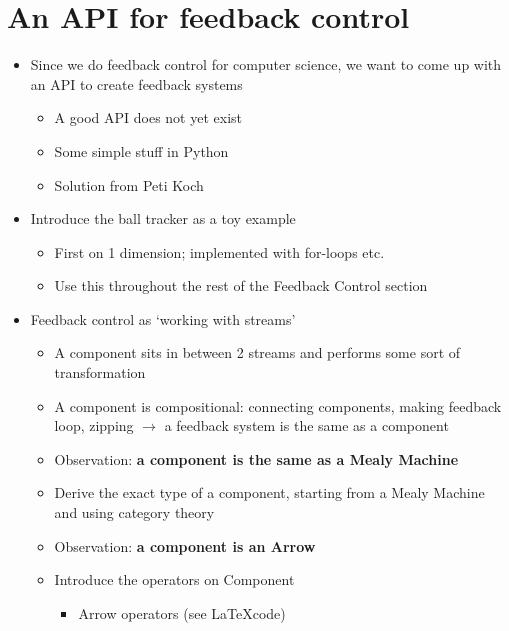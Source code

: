 \chapter{An API for feedback control}


\begin{itemize}
	\item Since we do feedback control for computer science, we want to come up with an API to create feedback systems
	\begin{itemize}
		\item A good API does not yet exist
		\item Some simple stuff in Python
		\item Solution from Peti Koch
	\end{itemize}
	\item Introduce the ball tracker as a toy example
	\begin{itemize}
		\item First on 1 dimension; implemented with for-loops etc.
		\item Use this throughout the rest of the Feedback Control section
	\end{itemize}
	\item Feedback control as ‘working with streams’
	\begin{itemize}
		\item A component sits in between 2 streams and performs some sort of transformation
		\item A component is compositional: connecting components, making feedback loop, zipping $\rightarrow$ a feedback system is the same as a component
		\item Observation: \textbf{a component is the same as a Mealy Machine}
		\item Derive the exact type of a component, starting from a Mealy Machine and using category theory
		\item Observation: \textbf{a component is an Arrow}
		\item Introduce the operators on Component
		\begin{itemize}
			\item Arrow operators (see \LaTeX code)

\end{itemize}
\end{itemize}
\end{itemize}
